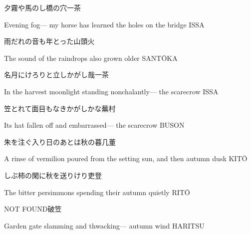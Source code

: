 \begin{haiku}
    {\FH 夕霧や馬のし橋の穴}\hfill{\FH 一茶}

    \vin{} Evening fog---
    \vin{} \vin{} my horse has learned
    \vin{} \vin{} \vin{} the holes on the bridge \hspace{\fill} ISSA
\end{haiku}

\begin{haiku}
    {\FH 雨だれの音も年とった}\hfill{\FH 山頭火}

    \vin{} The sound
    \vin{} \vin{} of the raindrops
    \vin{} \vin{} \vin{} also grown older \hspace{\fill} SANT\={O}KA
\end{haiku}

\begin{haiku}
    {\FH 名月にけろりと立しかがし哉}\hfill{\FH 一茶}

    \vin{} In the harvest moonlight
    \vin{} \vin{} standing nonchalantly---
    \vin{} \vin{} \vin{} the scarecrow \hspace{\fill} ISSA
\end{haiku}

\begin{haiku}
    {\FH 笠とれて面目もなきかがしかな}\hfill{\FH 蕪村}

    \vin{} Its hat fallen off
    \vin{} \vin{} and embarrassed---
    \vin{} \vin{} \vin{} the scarecrow \hspace{\fill} BUSON
\end{haiku}

\begin{haiku}
    {\FH 朱を注ぐ入り日のあとは秋の暮}\hfill{\FH 几董}

    \vin{} A rinse of vermilion poured
    \vin{} \vin{} from the setting sun, and then
    \vin{} \vin{} \vin{} autumn dusk \hspace{\fill} KIT\=O
\end{haiku}

\begin{haiku}
    {\FH しぶ柿の閑に秋を送りけり}\hfill{\FH 吏登}

    \vin{} The bitter persimmons
    \vin{} \vin{} spending their autumn
    \vin{} \vin{} \vin{} quietly \hspace{\fill} RIT\={O}
\end{haiku}

\begin{haiku}
    {NOT FOUND}\hfill{\FH 破笠}

    \vin{} Garden gate
    \vin{} \vin{} slamming and thwacking---
    \vin{} \vin{} \vin{} autumn wind \hspace{\fill} HARITSU
\end{haiku}

